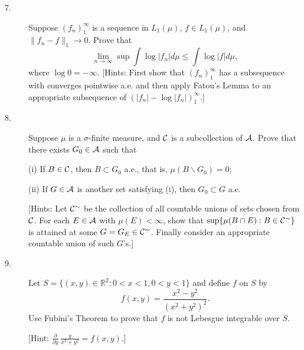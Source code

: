 \documentclass{article}
\def\R{\mathbb R}
\begin{document}
\begin{description}
\item[7.]
Suppose $(f_n)^\infty_1$ is a sequence in $L_1(\mu)$, $f \in L_1(\mu)$,
and $\parallel f_n - f\parallel_1 \to 0$. Prove that
$$\lim_{n \to \infty}\sup \int \log |f_n| d \mu \leq \int \log |f| d \mu,$$
where $\log 0 = -\infty$. [Hints: First show that $(f_n)^\infty_1$ has a
subsequence with converges pointwise a.e. and then apply Fatou's Lemma
to an appropriate subsequence of
$(|f_n| - \log |f_n|)^\infty_1$.]

\item[8.]
Suppose $\mu$ is a $\sigma$-finite measure, and ${\cal C}$ is a subcollection
of ${\cal A}$. Prove that there exists $G_0 \in {\cal A}$ such that

\item[\quad] (i)
If $B \in {\cal C}$, then $B \subset G_0$ a.e., that is,
$\mu (B \backslash G_0) = 0$;

\item[\quad] (ii)
If $G \in {\cal A}$ is another set satisfying (i), then $G_0 \subset G$
a.e.

[Hints: Let ${\cal C}^\sim$ be the collection of all countable unions of sets
chosen from ${\cal C}$. For each $E \in {\cal A}$ with
$\mu (E) < \infty$, show that $\sup\{\mu (B \cap E) : B \in {\cal C}^\sim\}$
is attained at some $G=G_E \in {\cal C}^\sim$. Finally consider an
appropriate countable union of such $G$'s.]

\item[9.]
Let $S=\{(x,y) \in \R^2 : 0 < x< 1, 0<y<1\}$ and define $f$ on $S$ by
$$f(x,y) = \frac{x^2 - y^2}{(x^2 +y^2)^2}.$$
Use Fubini's Theorem to prove that $f$ is not Lebesgue integrable over
$S$.

[Hint: $\frac{\partial}{\partial y} \, \frac{y}{x^2+y^2} = f(x,y)$.]






\end{description}    
\end{document}
